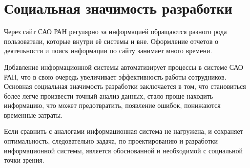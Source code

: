 \section{Социальная значимость разработки}
Через сайт САО РАН регулярно за информацией обращаются разного рода пользователи, которые внутри её системы и вне. Оформление отчетов о деятельности и поиск информации по сайту занимает много времени. 

Добавление информационной системы автоматизирует процессы в системе САО РАН, что в свою очередь увеличивает эффективность работы сотрудников. Основная социальная значимость разработки заключается в том, что становиться более легче произвести точный анализ данных, стало проще находить информацию, что может предотвратить, появление ошибок, понижаются временные затраты.

Если сравнить с аналогами информационная система не нагружена, и сохраняет оптимальность, следовательно задача, по проектированию и разработки информационной системы, является обоснованной и необходимой с социальной точки зрения.  

\pagebreak